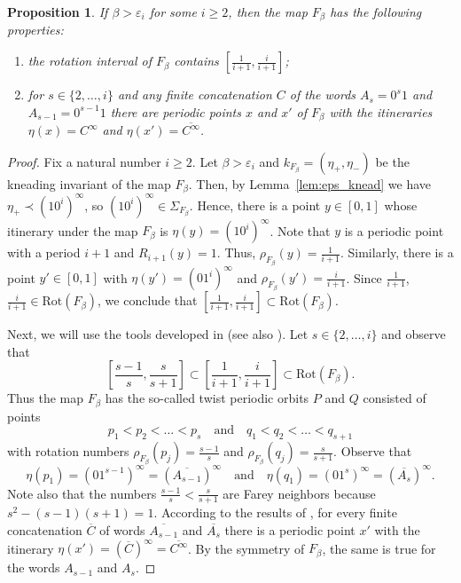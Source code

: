 \documentclass[10pt,reqno]{amsart}
\theoremstyle{plain}
\theoremstyle{assumption}
\theoremstyle{notation}
\theoremstyle{claim}
\theoremstyle{conj}
\theoremstyle{theorem}
\theoremstyle{proposition}
\newtheorem{proposition}{Proposition}[section]
\theoremstyle{corollary}
\begin{document}
\begin{proposition}\label{prop:itineraries_rot}
    If $\beta>\varepsilon_i$ for some $i\geq2$, then the map $F_{\beta}$ has the following properties:
        \begin{enumerate}
     \item the rotation interval of $F_{\beta}$ contains $[\frac{1}{i+1},\frac{i}{i+1}]$;
     \item for $s\in\{2,\ldots,i\}$ and any finite concatenation $C$ of the words $A_s=0^{s}1$ and $A_{s-1}=0^{s-1}1$ there are periodic points $x$ and $x'$ of $F_{\beta}$ with the itineraries $\eta(x)=C^\infty$ and $\eta(x')=\overline{C^\infty}$.
    \end{enumerate}
\end{proposition}
\begin{proof}
Fix a natural number $i\geq2$. Let $\beta>\varepsilon_i$ and $k_{F_{\beta}}=(\eta_+,\eta_-)$ be the kneading invariant of the map $F_{\beta}$. Then, by Lemma~\ref{lem:eps_knead} we have $\eta_+\prec(10^i)^\infty$, so $(10^i)^\infty\in\Sigma_{F_{\beta}}$. Hence, there is a point $y\in[0,1]$ whose itinerary under the map $F_{\beta}$ is $\eta(y)=(10^i)^\infty$. Note that $y$ is a periodic point with a period $i+1$ and $R_{i+1}(y)=1$. Thus, $\rho_{F_{\beta}}(y)=\frac{1}{i+1}$. Similarly, there is a point $y'\in[0,1]$ with $\eta(y')=(01^i)^\infty$ and $\rho_{F_{\beta}}(y')=\frac{i}{i+1}$. Since $\frac{1}{i+1}$, $\frac{i}{i+1}\in\text{Rot}(F_{\beta})$, we conclude that $[\frac{1}{i+1},\frac{i}{i+1}]\subset\text{Rot}(F_{\beta})$.

Next, we will use the tools developed in \cite{MiGel} (see also \cite{BNPSR}). Let $s\in\{2,\ldots,i\}$ and observe that
$$
\left[\frac{s-1}{s},\frac{s}{s+1}\right]\subset\left[\frac{1}{i+1},\frac{i}{i+1}\right]\subset\text{Rot}(F_{\beta}).
$$
Thus the map $F_{\beta}$ has the so-called twist periodic orbits $P$ and $Q$ consisted of points
$$
p_1<p_2<\ldots<p_s\quad\text{and}\quad q_1<q_2<\ldots<q_{s+1}
$$
with rotation numbers $\rho_{F_{\beta}}(p_j)=\frac{s-1}{s}$ and $\rho_{F_{\beta}}(q_j)=\frac{s}{s+1}$. Observe that 
$$
\eta(p_1)=(01^{s-1})^\infty=(\overline{A_{s-1}})^\infty\quad\text{and}\quad\eta(q_1)=(01^{s})^\infty=(\overline{A_{s}})^\infty.
$$
Note also that the numbers $\frac{s-1}{s}<\frac{s}{s+1}$ are Farey neighbors because $s^2-(s-1)(s+1)=1$. According to the results of \cite{MiGel}, for every finite concatenation $\overline{C}$ of words $\overline{A_{s-1}}$ and $\overline{A_{s}}$ there is a periodic point $x'$ with the itinerary $\eta(x')=(\overline{C})^\infty=\overline{C^\infty}$. By the symmetry of $F_{\beta}$, the same is true for the words $A_{s-1}$ and $A_s$.
\end{proof}
\end{document}
